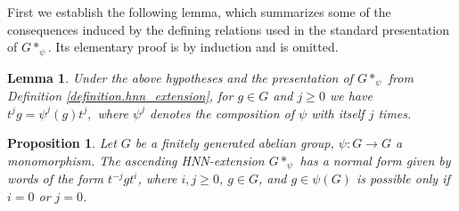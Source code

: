 \documentclass[cupthm,crop,info]{CUP-JNL-ETS}%
\theoremstyle{cupplain}
\newtheorem{lemma}[theorem]{Lemma}
\newtheorem{proposition}[theorem]{Proposition}
\theoremstyle{cupdefinition}
\theoremstyle{cupremark}
\theoremstyle{cupproof}
\numberwithin{equation}{section}
\begin{document}
First we establish the following lemma, which summarizes some of the consequences induced by the defining relations used in the standard presentation of $G*_{\psi}$. Its elementary proof is by induction and is omitted.

\begin{lemma}\label{lemma:ascending_hnn_further_identifications}
	Under the above hypotheses and the presentation of $G*_{\psi}$ from Definition \ref{definition.hnn_extension}, for $g\in G$ and $j\ge 0$ we have $	t^jg=\psi^j(g)t^j,$ where $\psi^j$ denotes the composition of $\psi$ with itself $j$ times.
\end{lemma}

\begin{proposition}\label{prop:normalform_ascending_hnn}
	Let $G$ be a finitely generated abelian group, $\psi:G\to G$ a monomorphism. The ascending HNN-extension $G*_{\psi}$ has a normal form given by words of the form $t^{-j}gt^{i}$, where $i,j\ge 0$, $g\in G$, and $g\in \psi(G)$ is possible only if $i=0$ or $j=0$.
\end{proposition}
\end{document}
